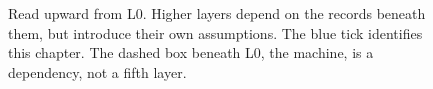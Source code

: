\begin{figure}[H]
\centering
{}
\caption{Read upward from L0. Higher layers depend on the records beneath them, but introduce their own assumptions. The blue tick identifies this chapter. The dashed box beneath L0, the machine, is a dependency, not a fifth layer.}
\label{fig:swk-stack-map}
\end{figure}
